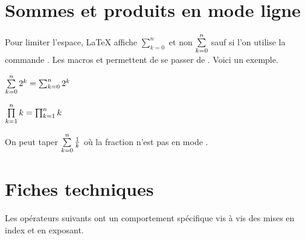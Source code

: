 \documentclass[12pt,a4paper]{article}
\begin{document}
\section{Sommes et produits en mode ligne}

Pour limiter l'espace, \LaTeX{} affiche $\sum_{k=0}^{n}$ et non $\sum\limits_{k=0}^{n}$ sauf si l'on utilise la commande .
Les macros  et  permettent de se passer de .
Voici un exemple.


\begin{latexex}
 $\sum\limits_{k=0}^{n} 2^k
= \sum_{k=0}^{n} 2^k$

 $\prod\limits_{k=1}^{n} k
= \prod_{k=1}^{n} k$
\end{latexex}


\begin{remark}
	On peut taper  $\sum\limits_{k=0}^{n} \frac{1}{k}$ où la fraction n'est pas en mode .
\end{remark}




\section{Fiches techniques}

Les opérateurs suivants ont un comportement spécifique vis à vis des mises en index et en exposant. 


\separation



\end{document}
